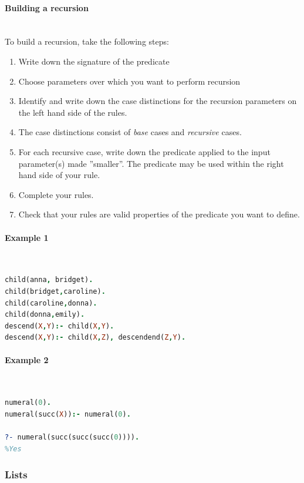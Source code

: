 \paragraph{Building a recursion} \hfill \\

To build a recursion, take the following steps:

\begin{enumerate}
	\item Write down the signature of the predicate
	\item Choose parameters over which you want to perform recursion
	\item Identify and write down the case distinctions for the recursion parameters on the left hand side of the rules.
	\item The case distinctions consist of \emph{base} cases and \emph{recursive} cases.
	\item For each recursive case, write down the predicate applied to the input parameter(s) made ''smaller''. The predicate may be used within the right hand side of your rule.
	\item Complete your rules.
	\item Check that your rules are valid properties of the predicate you want to define.
\end{enumerate}

\paragraph{Example 1} \hfill \\

\begin{lstlisting}[language=Prolog]
child(anna, bridget).
child(bridget,caroline).
child(caroline,donna).
child(donna,emily).
descend(X,Y):- child(X,Y).
descend(X,Y):- child(X,Z), descendend(Z,Y).
\end{lstlisting}

\paragraph{Example 2} \hfill \\

\begin{lstlisting}[language=Prolog]
numeral(0).
numeral(succ(X)):- numeral(0).

?- numeral(succ(succ(succ(0)))).
%Yes
\end{lstlisting}

\subsubsection{Lists}

